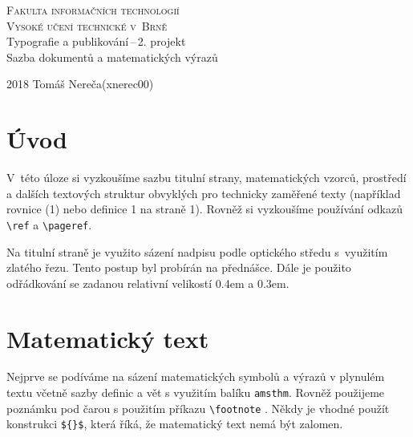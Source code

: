 \documentclass[a4paper, 11pt, twocolumn]{article}
\theoremstyle{definition}
\begin{document}
\begin{titlepage}
\begin{center}
	
	\textsc{\Huge Fakulta informačních technologií\\[3.5mm]
			Vysoké učení technické v~Brně}
	\\[79mm]
	{\LARGE Typografie a publikování\,--\,2. projekt\\[1.5mm]
	Sazba dokumentů a matematických výrazů}
	\vfill
\end{center}
{\Large 2018 \hfill Tomáš Nereča(xnerec00)}
\\[-4mm]
\end{titlepage}

\section*{Úvod}
V~této úloze si vyzkoušíme sazbu titulní strany, matematických vzorců, prostředí a dalších textových struktur obvyklých pro technicky zaměřené texty (například rovnice (1) nebo definice 1 na straně 1). Rovněž si vyzkoušíme používání odkazů \verb|\ref| a \verb|\pageref|.

Na titulní straně je využito sázení nadpisu podle optického středu s~využitím zlatého řezu. Tento postup byl probírán na přednášce. Dále je použito odřádkování se
zadanou relativní velikostí 0.4em a 0.3em.

\section{Matematický text}
Nejprve se podíváme na sázení matematických symbolů a výrazů v plynulém textu včetně sazby definic a vět s využitím balíku \verb|amsthm|. Rovněž použijeme poznámku pod čarou s použitím příkazu \verb|\footnote| . Někdy je vhodné použít konstrukci \verb|${}$|, která říká, že matematický text nemá být zalomen.
\end{document}
